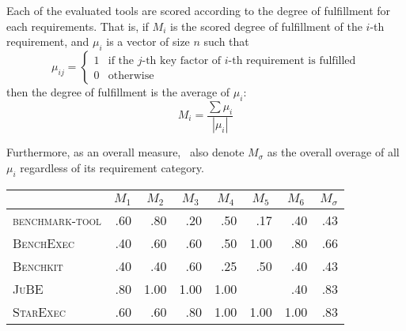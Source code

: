 Each of the evaluated tools are scored according to the degree of fulfillment for each requirements.
That is, if $M_i$ is the scored degree of fulfillment of the $i$-th requirement, and $\mu_{i}$ is a vector of size $n$ such that
\[
	\mu_{ij} =
	\begin{cases}
		1 & \text{if the $j$-th key factor of $i$-th requirement is fulfilled} \\
		0 & \text{otherwise}
	\end{cases}
\]
then the degree of fulfillment is the average of $\mu_i$:
\[
	M_i = \frac{\sum\mu_{i}}{|\mu_i|}
\]

Furthermore, as an overall measure, \first~also denote $M_\sigma$ as the overall overage of all $\mu_{i}$ regardless of its requirement category.


\begin{table}
	\begin{threeparttable}
		\begin{adjustbox}{max width=\textwidth}
			\begin{tabular}{lddddddd}
				                              &  &  &  &  &  &  &  \\
				\midrule
				\textsc{benchmark-tool}       & .60                       & .80                       & .20                       & .50                       & .17                       & .40                       & .43                            \\
				\textsc{BenchExec}            & .40                       & .60                       & .60                       & .50                       & 1.00                      & .80                       & .66                            \\
				\textsc{Benchkit}             & .40                       & .40                       & .60                       & .25                       & .50                       & .40                       & .43                            \\
				\textsc{JuBE}                 & .80                       & 1.00                      & 1.00                      & 1.00                      &                           & .40                       & .83                            \\
				\textsc{StarExec}             & .60                       & .60                       & .80                       & 1.00                      & 1.00                      & 1.00                      & .83                            \\

\end{tabular}
\end{adjustbox}
\end{threeparttable}
\end{table}
